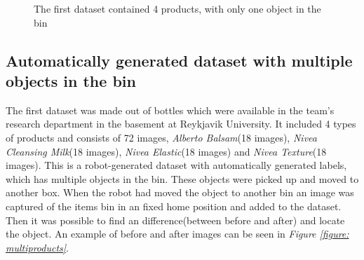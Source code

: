 \begin{figure}[h]
    \centering
    \hspace{2 cm}
    \hspace{2 cm}
    \hspace{2 cm}
    \caption{The first dataset contained 4 products, with only one object in the bin}
    \label{figure: products}
\end{figure}

\subsection{Automatically generated dataset with multiple objects in the bin} \label{sec:multidataset}
The first dataset was made out of bottles which were available in the team’s research department in the basement at Reykjavik University. It included 4 types of products and consists of 72 images, \textit{Alberto Balsam}(18 images), \textit{Nivea Cleansing Milk}(18 images), \textit{Nivea Elastic}(18 images) and \textit{Nivea Texture}(18 images). 
This is a robot-generated dataset with automatically generated labels, which has multiple objects in the bin. 
These objects were picked up and moved to another box. When the robot had moved the object to another bin an image was captured of the items bin in an fixed home position and  added to the dataset. Then it was possible to find an difference(between before and after) and locate the object.
An example of before and after images can be seen in \textit{Figure \ref{figure: multiproducts}}. 

